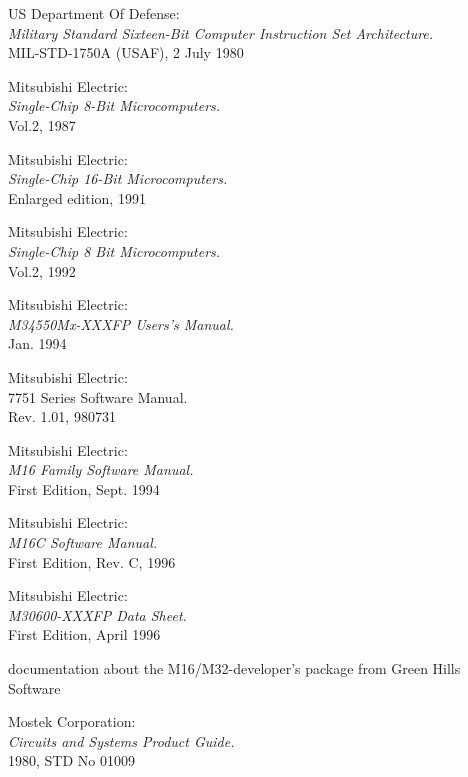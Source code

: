  US Department Of Defense: \\
                  {\em Military Standard Sixteen-Bit Computer
                  Instruction Set Architecture.\/} \\
                  MIL-STD-1750A (USAF), 2 July 1980

 Mitsubishi Electric: \\
                {\em Single-Chip 8-Bit Microcomputers.\/} \\
                Vol.2, 1987

 Mitsubishi Electric: \\
                {\em Single-Chip 16-Bit Microcomputers.\/} \\
                Enlarged edition, 1991

 Mitsubishi Electric: \\
               {\em Single-Chip 8 Bit Microcomputers.\/} \\
               Vol.2, 1992

 Mitsubishi Electric: \\
                  {\em M34550Mx-XXXFP Users's Manual.\/} \\
                  Jan. 1994

 Mitsubishi Electric: \\
                  { 7751 Series Software Manual.\/} \\
                  Rev. 1.01, 980731

 Mitsubishi Electric: \\
                 {\em M16 Family Software Manual.\/} \\
                 First Edition, Sept. 1994

 Mitsubishi Electric: \\
      	          {\em M16C Software Manual.\/} \\
                  First Edition, Rev. C, 1996

 Mitsubishi Electric: \\
                   {\em M30600-XXXFP Data Sheet.\/} \\
                   First Edition, April 1996

 documentation about the M16/M32-developer's package
                   from Green Hills Software

 Mostek Corporation: \\
                     {\em Circuits and Systems Product Guide.\/} \\
                     1980, STD No 01009

